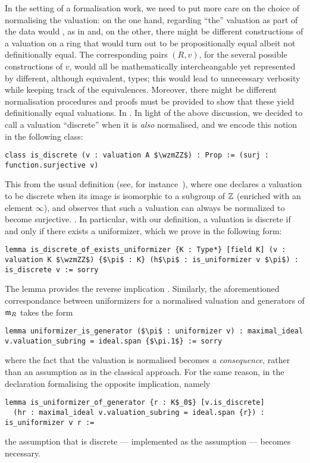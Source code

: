 \documentclass[sigplan,10pt,anonymous,review]{acmart}
\begin{document}
In the setting of a formalisation work, we need to put more care on the choice of normalising the valuation: on the one hand, regarding ``the'' valuation as part of the data would , as in  and, on the other, there might be different constructions of a valuation on a ring that would turn out to be propositionally equal albeit not definitionally equal. The corresponding pairs $(R,v)$, for the several possible constructions of $v$, would all be mathematically intercheangable yet represented by different, although equivalent, types; this would lead to unnecessary verbosity while keeping track of the equivalences. Moreover, there might be different normalisation procedures and proofs must be provided to show that these yield definitionally equal valuations. In . In light of the above discussion, we decided to call a valuation ``discrete'' when it is \emph{also} normalised, and we encode this notion in the following class:
\begin{lstlisting}
class is_discrete (v : valuation A $\wzmZZ$) : Prop := (surj : function.surjective v)
\end{lstlisting}
This  from the usual definition (see, for instance~\cite[Proposition~I.1]{Ser62}), where one declares a valuation to be discrete when its image is isomorphic to a subgroup of $\mathbb{Z}$ (enriched with an element $\infty$), and observes that such a valuation can always be normalized to become surjective. . In particular, with our definition, a valuation is discrete if and only if there exists a uniformizer, which we prove in the following form:
\begin{lstlisting}
lemma is_discrete_of_exists_uniformizer {K : Type*} [field K] (v : valuation K $\wzmZZ$) {$\pi$ : K} (h$\pi$ : is_uniformizer v $\pi$) : is_discrete v := sorry
\end{lstlisting}
The lemma  provides the reverse implication . Similarly, the aforementioned correspondance between uniformizers for a normalised valuation and generators of $\mathfrak{m}_{R}$ takes the form
\begin{lstlisting}
lemma uniformizer_is_generator ($\pi$ : uniformizer v) : maximal_ideal v.valuation_subring = ideal.span {$\pi.1$} := sorry
\end{lstlisting}
where the fact that the valuation is normalised becomes \emph{a consequence}, rather than an assumption as in the classical approach. For the same reason, in the declaration formalising the opposite implication, namely
\begin{lstlisting}
lemma is_uniformizer_of_generator {r : K$_0$} [v.is_discrete]
  (hr : maximal_ideal v.valuation_subring = ideal.span {r}) : is_uniformizer v r :=
\end{lstlisting}
the assumption that  is discrete --- implemented as the  assumption \code{[v.is_discrete]} --- becomes necessary.
\end{document}
